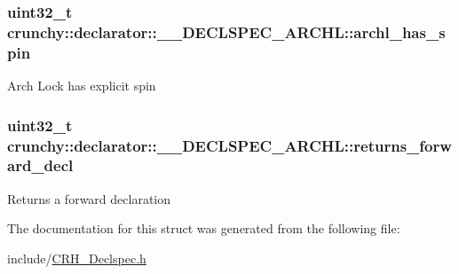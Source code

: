 \subsubsection[{archl\+\_\+has\+\_\+spin}]{\setlength{\rightskip}{0pt plus 5cm}uint32\+\_\+t crunchy\+::declarator\+::\+\_\+\+\_\+\+D\+E\+C\+L\+S\+P\+E\+C\+\_\+\+A\+R\+C\+H\+L\+::archl\+\_\+has\+\_\+spin}\label{structcrunchy_1_1declarator_1_1_____d_e_c_l_s_p_e_c___a_r_c_h_l_aadc3174237edfc7511f0b8bd94fde0ba}
Arch Lock has explicit spin \hypertarget{structcrunchy_1_1declarator_1_1_____d_e_c_l_s_p_e_c___a_r_c_h_l_a73a2d868629fed82ad40089b1a7066d4}{}
\subsubsection[{returns\+\_\+forward\+\_\+decl}]{\setlength{\rightskip}{0pt plus 5cm}uint32\+\_\+t crunchy\+::declarator\+::\+\_\+\+\_\+\+D\+E\+C\+L\+S\+P\+E\+C\+\_\+\+A\+R\+C\+H\+L\+::returns\+\_\+forward\+\_\+decl}\label{structcrunchy_1_1declarator_1_1_____d_e_c_l_s_p_e_c___a_r_c_h_l_a73a2d868629fed82ad40089b1a7066d4}
Returns a forward declaration 

The documentation for this struct was generated from the following file\+:\begin{DoxyCompactItemize}
\item 
include/\hyperlink{_c_r_h___declspec_8h}{C\+R\+H\+\_\+\+Declspec.\+h}\end{DoxyCompactItemize}
